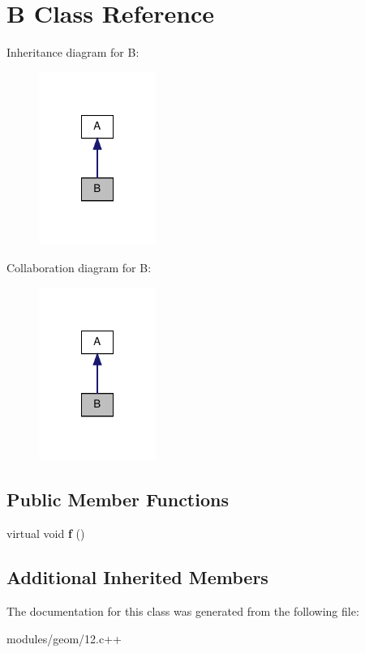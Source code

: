 \hypertarget{classB}{\section{B Class Reference}
\label{classB}
}


Inheritance diagram for B\-:\nopagebreak
\begin{figure}[H]
\begin{center}
\leavevmode
\includegraphics[width=108pt]{classB__inherit__graph}
\end{center}
\end{figure}


Collaboration diagram for B\-:\nopagebreak
\begin{figure}[H]
\begin{center}
\leavevmode
\includegraphics[width=108pt]{classB__coll__graph}
\end{center}
\end{figure}
\subsection*{Public Member Functions}
\begin{DoxyCompactItemize}
\item 
\hypertarget{classB_a5c163abe1e7a9e4c509e11e536e25323}{virtual void {\bfseries f} ()}\label{classB_a5c163abe1e7a9e4c509e11e536e25323}

\end{DoxyCompactItemize}
\subsection*{Additional Inherited Members}


The documentation for this class was generated from the following file\-:\begin{DoxyCompactItemize}
\item 
modules/geom/12.\-c++\end{DoxyCompactItemize}
